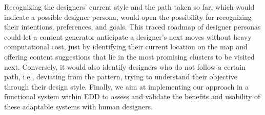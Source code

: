 


Recognizing the designers' current style and the path taken so far, which would indicate a possible designer persona, would open the possibility for recognizing their intentions, preferences, and goals. This traced roadmap of designer personas could let a content generator anticipate a designer's next moves without heavy computational cost, just by identifying their current location on the map and offering content suggestions that lie in the most promising clusters to be visited next. Conversely, it would also identify designers who do not follow a certain path, i.e., deviating from the pattern, trying to understand their objective through their design style. Finally, we aim at implementing our approach in a functional system within EDD to assess and validate the benefits and usability of these adaptable systems with human designers.




